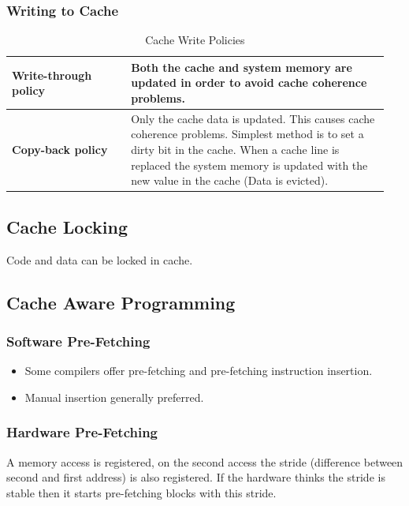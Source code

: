 		\subsubsection{Writing to Cache}
			\begin{table}[H]
				\centering
				\begin{tabular}{|>{\bfseries}p{0.3\linewidth}|p{0.65\linewidth}|}
					\hline
					Write-through policy
						& Both the cache and system memory are updated in order to avoid cache coherence problems.\\
					\hline
					Copy-back policy
						& Only the cache data is updated. This causes cache coherence problems. Simplest method is to set a dirty bit in the cache. When a cache line is replaced the system memory is updated with the new value in the cache (Data is evicted).\\
					\hline
				\end{tabular}
				\caption{Cache Write Policies}
			\end{table}
			
	\subsection{Cache Locking}
		Code and data can be locked in cache.
		
		
	\subsection{Cache Aware Programming}
		\subsubsection{Software Pre-Fetching }
			\begin{itemize}
			  \item Some compilers offer pre-fetching and pre-fetching instruction insertion.
			  \item Manual insertion generally preferred.
			\end{itemize}
			
		
		
		\subsubsection{Hardware Pre-Fetching }
			A memory access is registered, on the second access the stride (difference between second and first address) is also registered. If the hardware thinks the stride is stable then it starts pre-fetching blocks with this stride.
			
